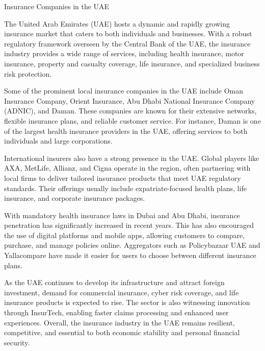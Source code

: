 Insurance Companies in the UAE

The United Arab Emirates (UAE) hosts a dynamic and rapidly growing insurance market that caters to both individuals and businesses. With a robust regulatory framework overseen by the Central Bank of the UAE, the insurance industry provides a wide range of services, including health insurance, motor insurance, property and casualty coverage, life insurance, and specialized business risk protection.

Some of the prominent local insurance companies in the UAE include Oman Insurance Company, Orient Insurance, Abu Dhabi National Insurance Company (ADNIC), and Daman. These companies are known for their extensive networks, flexible insurance plans, and reliable customer service. For instance, Daman is one of the largest health insurance providers in the UAE, offering services to both individuals and large corporations.

International insurers also have a strong presence in the UAE. Global players like AXA, MetLife, Allianz, and Cigna operate in the region, often partnering with local firms to deliver tailored insurance products that meet UAE regulatory standards. Their offerings usually include expatriate-focused health plans, life insurance, and corporate insurance packages.

With mandatory health insurance laws in Dubai and Abu Dhabi, insurance penetration has significantly increased in recent years. This has also encouraged the use of digital platforms and mobile apps, allowing customers to compare, purchase, and manage policies online. Aggregators such as Policybazaar UAE and Yallacompare have made it easier for users to choose between different insurance plans.

As the UAE continues to develop its infrastructure and attract foreign investment, demand for commercial insurance, cyber risk coverage, and life insurance products is expected to rise. The sector is also witnessing innovation through InsurTech, enabling faster claims processing and enhanced user experiences. Overall, the insurance industry in the UAE remains resilient, competitive, and essential to both economic stability and personal financial security.


